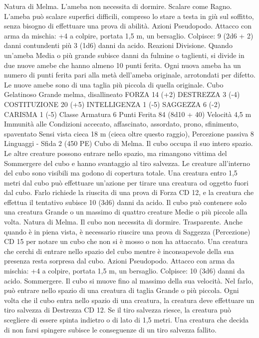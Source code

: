 \begin{multicols}{2}
Natura di Melma. L’ameba non necessita di dormire.
Scalare come Ragno. L’ameba può scalare superfici difficili,
compreso lo stare a testa in giù sul soffitto, senza bisogno di
effettuare una prova di abilità.
Azioni
Pseudopodo. Attacco con arma da mischia: +4 a colpire, portata
1,5 m, un bersaglio.
Colpisce: 9 (2d6 + 2) danni contundenti più 3 (1d6) danni da acido.
Reazioni
Divisione. Quando un’ameba Media o più grande subisce danni da
fulmine o taglienti, si divide in due nuove amebe che hanno almeno
10 punti ferita. Ogni nuova ameba ha un numero di punti ferita pari
alla metà dell’ameba originale, arrotondati per difetto. Le nuove
amebe sono di una taglia più piccola di quella originale.
Cubo Gelatinoso
Grande melma, disallineato
FORZA 14 (+2)
DESTREZZA 3 (-4)
COSTITUZIONE 20 (+5)
INTELLIGENZA 1 (-5)
SAGGEZZA 6 (-2)
CARISMA 1 (-5)
Classe Armatura 6
Punti Ferita 84 (8d10 + 40)
Velocità 4,5 m
Immunità alle Condizioni accecato, affascinato, assordato,
prono, sfinimento, spaventato
Sensi vista cieca 18 m (cieca oltre questo raggio), Percezione
passiva 8
Linguaggi -
Sfida 2 (450 PE)
Cubo di Melma. Il cubo occupa il suo intero spazio. Le altre
creature possono entrare nello spazio, ma rimangono vittima del
Sommergere del cubo e hanno svantaggio al tiro salvezza.
Le creature all’interno del cubo sono visibili ma godono di
copertura totale.
Una creatura entro 1,5 metri dal cubo può effettuare un’azione
per tirare una creatura od oggetto fuori dal cubo. Farlo richiede la
riuscita di una prova di Forza CD 12, e la creatura che effettua il
tentativo subisce 10 (3d6) danni da acido.
Il cubo può contenere solo una creatura Grande o un massimo di
quattro creature Medie o più piccole alla volta.
Natura di Melma. Il cubo non necessita di dormire.
Trasparente. Anche quando è in piena vista, è necessario riuscire
una prova di Saggezza (Percezione) CD 15 per notare un cubo
che non si è mosso o non ha attaccato. Una creatura che cerchi di
entrare nello spazio del cubo mentre è inconsapevole della sua
presenza resta sorpresa dal cubo.
Azioni
Pseudopodo. Attacco con arma da mischia: +4 a colpire, portata
1,5 m, un bersaglio.
Colpisce: 10 (3d6) danni da acido.
Sommergere. Il cubo si muove fino al massimo della sua velocità.
Nel farlo, può entrare nello spazio di una creatura di taglia Grande o
più piccola. Ogni volta che il cubo entra nello spazio di una creatura,
la creatura deve effettuare un tiro salvezza di Destrezza CD 12.
Se il tiro salvezza riesce, la creatura può scegliere di essere spinta
indietro o di lato di 1,5 metri. Una creatura che decida di non farsi
spingere subisce le conseguenze di un tiro salvezza fallito.

\end{multicols}
